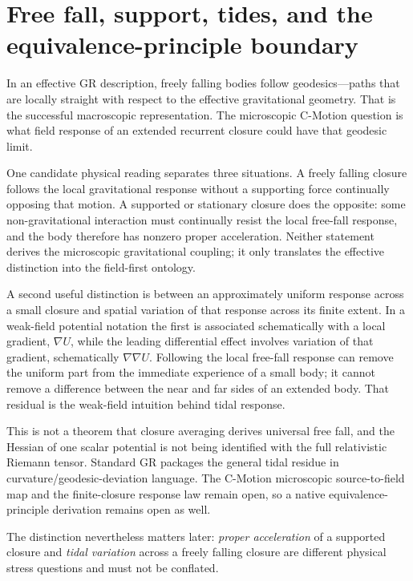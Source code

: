 \documentclass[11pt]{article}
\newcommand{\cmotion}{\mbox{C-Motion}}
\theoremstyle{plain}
\theoremstyle{remark}
\begin{document}
\section{Free fall, support, tides, and the equivalence-principle boundary}
\label{sec:freefall}

In an effective GR description, freely falling bodies follow geodesics---paths that are
locally straight with respect to the effective gravitational geometry.  That is the
successful macroscopic representation.  The microscopic \cmotion{} question is what
field response of an extended recurrent closure could have that geodesic limit.

One candidate physical reading separates three situations.  A freely falling closure
follows the local gravitational response without a supporting force continually opposing
that motion.  A supported or stationary closure does the opposite: some non-gravitational
interaction must continually resist the local free-fall response, and the body therefore
has nonzero proper acceleration.  Neither statement derives the microscopic gravitational
coupling; it only translates the effective distinction into the field-first ontology.

A second useful distinction is between an approximately uniform response across a small
closure and spatial variation of that response across its finite extent.  In a weak-field
potential notation the first is associated schematically with a local gradient,
$\nabla U$, while the leading differential effect involves variation of that gradient,
schematically $\nabla\nabla U$.  Following the local free-fall response can remove the
uniform part from the immediate experience of a small body; it cannot remove a
difference between the near and far sides of an extended body.  That residual is the
weak-field intuition behind tidal response.

This is not a theorem that closure averaging derives universal free fall, and the Hessian
of one scalar potential is not being identified with the full relativistic Riemann
tensor.  Standard GR packages the general tidal residue in curvature/geodesic-deviation
language.  The \cmotion{} microscopic source-to-field map and the finite-closure response
law remain open, so a native equivalence-principle derivation remains open as well.

The distinction nevertheless matters later: \emph{proper acceleration} of a supported
closure and \emph{tidal variation} across a freely falling closure are different physical
stress questions and must not be conflated.
\end{document}
